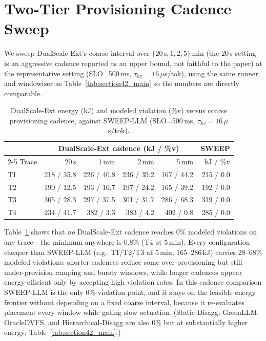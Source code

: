 \section{Two-Tier Provisioning Cadence Sweep}
\label{sec:cadence_detail}

We sweep DualScale-Ext's coarse interval over $\{20\,\text{s}, 1, 2, 5\}$\,min (the $20$\,s setting is an aggressive cadence reported as an upper bound, not faithful to the paper) at the representative setting (SLO=500\,ms, $\tau_{kv}{=}16\,\mu$s/tok), using the same runner and windowizer as Table~\ref{tab:section42_main} so the numbers are directly comparable.

\begin{table}[t]
\centering
\caption{DualScale-Ext energy (kJ) and modeled violation (\%v) versus coarse provisioning cadence, against SWEEP-LLM (SLO=500\,ms, $\tau_{kv}{=}16\,\mu$s/tok).}
\label{tab:cadence}
\small
\setlength{\tabcolsep}{4pt}
\begin{tabular}{@{}lrrrrr@{}}
\toprule
 & \multicolumn{4}{c}{DualScale-Ext cadence (kJ / \%v)} & SWEEP \\
\cmidrule(lr){2-5}
Trace & 20\,s & 1\,min & 2\,min & 5\,min & kJ / \%v \\
\midrule
T1 & 218 / 35.8 & 226 / 40.8 & 236 / 39.2 & 167 / 44.2 & 215 / 0.0 \\
T2 & 190 / 12.5 & 193 / 16.7 & 197 / 24.2 & 165 / 39.2 & 192 / 0.0 \\
T3 & 305 / 28.3 & 297 / 37.5 & 301 / 31.7 & 286 / 68.3 & 319 / 0.0 \\
T4 & 234 / 41.7 & 382 / \phantom{0}3.3 & 383 / \phantom{0}4.2 & 402 / \phantom{0}0.8 & 285 / 0.0 \\
\bottomrule
\end{tabular}
\end{table}

Table~\ref{tab:cadence} shows that \emph{no} DualScale-Ext cadence reaches $0\%$ modeled
violations on any trace---the minimum anywhere is $0.8\%$ (T4 at $5$\,min). Every
configuration cheaper than SWEEP-LLM (e.g.\ T1/T2/T3 at $5$\,min, $165$--$286$\,kJ) carries
$28$--$68\%$ modeled violations: shorter cadences reduce some over-provisioning but still
under-provision ramping and bursty windows, while longer cadences appear energy-efficient
only by accepting high violation rates. In this cadence comparison SWEEP-LLM is the only
$0\%$-violation point, and it stays on the feasible energy frontier without depending on a
fixed coarse interval, because it re-evaluates placement every window while gating slow
actuation. (Static-Disagg, GreenLLM-OracleDVFS, and Hierarchical-Disagg are also $0\%$ but
at substantially higher energy; Table~\ref{tab:section42_main}.)


